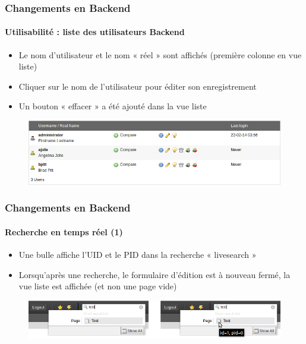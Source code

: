 
\begin{frame}[fragile]
	\frametitle{Changements en Backend}
	\framesubtitle{Utilisabilité : liste des utilisateurs Backend}

	\begin{itemize}
		\item Le nom d'utilisateur et le nom « réel » sont affichés (première colonne en vue liste)
		\item Cliquer sur le nom de l'utilisateur pour éditer son enregistrement
		\item Un bouton « effacer » a été ajouté dans la vue liste
	\end{itemize}

	\begin{figure}
		\includegraphics[width=0.95\linewidth]{Images/BackendChanges/BackendUserList.png}
	\end{figure}

\end{frame}


\begin{frame}[fragile]
	\frametitle{Changements en Backend}
	\framesubtitle{Recherche en temps réel (1)}

	\begin{itemize}
		\item Une bulle affiche l'UID et le PID dans la recherche « livesearch »
		\item Lorsqu'après une recherche, le formulaire d'édition est à nouveau fermé, la vue liste est affichée (et non une page vide)
	\end{itemize}

	\begin{figure}
		\includegraphics[width=0.8\linewidth]{Images/BackendChanges/LiveSearchTooltip.png}
	\end{figure}

\end{frame}

